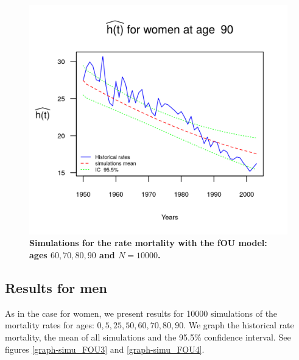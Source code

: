 \documentclass[smallextended]{svjour3}
\begin{document}
\begin{figure}[H]
    \includegraphics{PlotWomen90.png}
    \caption{\bf Simulations for the rate mortality with the fOU model: ages
    $60,70,80,90$ and $N=10000$.}
    \label{graph-simu_FOU2}
\end{figure}\vspace*{0.1cm}


\subsection{Results for men}\label{re-men}

As in the case for women, we present results for 10000 simulations of the
mortality rates for ages: $0,5,25,50,60,70,80,90$.
We graph the historical rate mortality, the mean of all simulations and the
95.5\% confidence interval. See figures \ref{graph-simu_FOU3} and
\ref{graph-simu_FOU4}.\\
\end{document}
